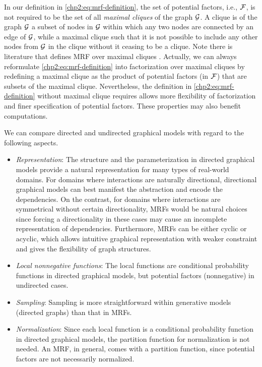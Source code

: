 \begin{remark}
In our definition in \eqref{chp2:eq:mrf-definition}, the set of potential factors, i.e., $\mathcal{F}$, is not required to be the set of all \textit{maximal cliques} of the graph $\mathcal{G}$. A clique is of the graph $\mathcal{G}$ a subset of nodes in $\mathcal{G}$ within which any two nodes are connected by an edge of $\mathcal{G}$, while a maximal clique such that it is not possible to include any other nodes from $\mathcal{G}$ in the clique without it ceasing to be a clique. Note there is literature that defines MRF over maximal cliques \cite[section~8.3.2]{Bishop:2006:PRM:1162264}. Actually, we can always reformulate \eqref{chp2:eq:mrf-definition} into factorization over maximal cliques by redefining a maximal clique as the product of potential factors (in $\mathcal{F}$) that are subsets of the maximal clique. Nevertheless, the definition in \eqref{chp2:eq:mrf-definition} without maximal clique requires allows more flexibility of factorization and finer specification of potential factors. These properties may also benefit computations.
\end{remark}

\begin{remark}
  We can compare directed and undirected graphical models with regard to the following aspects.
  \begin{itemize}
  \item \textit{Representation}: The structure and the parameterization in directed graphical models provide a natural representation for many types of real-world domains. For domains where interactions are naturally directional, directional graphical models can best manifest the abstraction and encode the dependencies. On the contrast, for domains where interactions are symmetrical without certain directionality, MRFs would be natural choices since forcing a directionality in these cases may cause an incomplete representation of dependencies. Furthermore, MRFs can be either cyclic or acyclic, which allows intuitive graphical representation with weaker constraint and gives the flexibility of graph structures.
  \item \textit{Local nonnegative functions}: The local functions are conditional probability functions in directed graphical models, but potential factors (nonnegative) in undirected cases.
  \item \textit{Sampling}: Sampling is more straightforward within generative models (directed graphs) than that in MRFs.
  \item \textit{Normalization}: Since each local function is a conditional probability function in directed graphical models, the partition function for normalization is not needed. An MRF, in general, comes with a partition function, since potential factors are not necessarily normalized.
  \end{itemize}
\end{remark}

